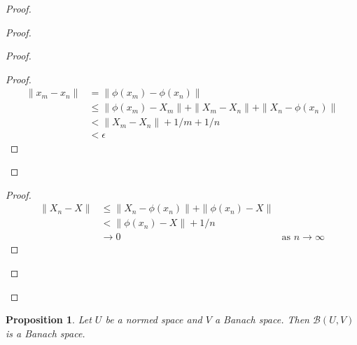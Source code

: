 \documentclass{book}
\let\qed\relax
\newtheorem{prop}[ax]{Proposition}
\theoremstyle{definition}
\begin{document}
\begin{proof}
\begin{proof}
\begin{proof}
		\begin{proof}
			\pf
			\begin{align*}
				\|x_m - x_n\| & = \| \phi(x_m) - \phi(x_n) \| \\
				& \leq \| \phi(x_m) - X_m \| + \| X_m - X_n \| + \| X_n - \phi(x_n)\| \\
				& < \|X_m - X_n\| + 1/m + 1/n \\
				& < \epsilon
			\end{align*}
		\end{proof}
	\end{proof}
	\begin{proof}
		\pf
		\begin{align*}
			\|X_n - X\| & \leq \| X_n - \phi(x_n) \| + \| \phi(x_n) - X \| \\
			& < \| \phi(x_n) - X \| + 1/n \\
			& \rightarrow 0 & \text{as } n \rightarrow \infty
		\end{align*}
	\end{proof}
\end{proof}
\qed
\end{proof}

\begin{prop}
Let $U$ be a normed space and $V$ a Banach space. Then $\mathcal{B}(U,V)$ is a Banach space.
\end{prop}
\end{document}
